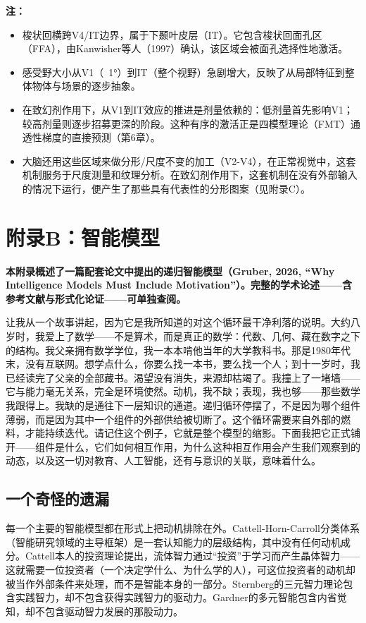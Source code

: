 \documentclass[11pt, twoside, openright]{book}
\begin{document}
\textbf{注：}
\begin{itemize}
  \item 梭状回横跨V4/IT边界，属于下颞叶皮层（IT）。它包含梭状回面孔区（FFA），由Kanwisher等人（1997）确认，该区域会被面孔选择性地激活。
  \item 感受野大小从V1（~1°）到IT（整个视野）急剧增大，反映了从局部特征到整体物体与场景的逐步抽象。
  \item 在致幻剂作用下，从V1到IT效应的推进是剂量依赖的：低剂量首先影响V1；较高剂量则逐步招募更深的阶段。这种有序的激活正是四模型理论（FMT）通透性梯度的直接预测（第6章）。
  \item 大脑还用这些区域来做分形/尺度不变的加工（V2-V4），在正常视觉中，这套机制服务于尺度测量和纹理分析。在致幻剂作用下，这套机制在没有外部输入的情况下运行，便产生了那些具有代表性的分形图案（见附录C）。
\end{itemize}


\chapter*{附录B：智能模型}

\textbf{本附录概述了一篇配套论文中提出的递归智能模型（Gruber, 2026, ``Why Intelligence Models Must Include Motivation''）。完整的学术论述------含参考文献与形式化论证------可单独查阅。}

让我从一个故事讲起，因为它是我所知道的对这个循环最干净利落的说明。大约八岁时，我爱上了数学------不是算术，而是真正的数学：代数、几何、藏在数字之下的结构。我父亲拥有数学学位，我一本本啃他当年的大学教科书。那是1980年代末，没有互联网。想学点什么，你要么找一本书，要么找一个人；到十一岁时，我已经读完了父亲的全部藏书。渴望没有消失，来源却枯竭了。我撞上了一堵墙------它与能力毫无关系，完全是环境使然。动机，我不缺；表现，我也够------那些数学我跟得上。我缺的是通往下一层知识的通道。递归循环停摆了，不是因为哪个组件薄弱，而是因为其中一个组件的外部供给被切断了。这个循环需要来自外部的燃料，才能持续迭代。请记住这个例子，它就是整个模型的缩影。下面我把它正式铺开------组件是什么，它们如何相互作用，为什么这种相互作用会产生我们观察到的动态，以及这一切对教育、人工智能，还有与意识的关联，意味着什么。

\section*{一个奇怪的遗漏}

每一个主要的智能模型都在形式上把动机排除在外。Cattell-Horn-Carroll分类体系（智能研究领域的主导框架）是一套认知能力的层级结构，其中没有任何动机成分。Cattell本人的投资理论提出，流体智力通过“投资”于学习而产生晶体智力------这就需要一位投资者（一个决定学什么、为什么学的人），可这位投资者的动机却被当作外部条件来处理，而不是智能本身的一部分。Sternberg的三元智力理论包含实践智力，却不包含获得实践智力的驱动力。Gardner的多元智能包含内省觉知，却不包含驱动智力发展的那股动力。
\end{document}
